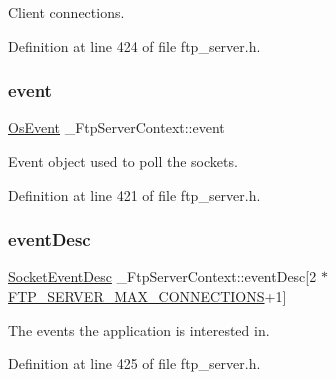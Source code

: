 Client connections. 



Definition at line 424 of file ftp\+\_\+server.\+h.

\mbox{\label{struct__FtpServerContext_a940308f73a285177761851d18321200c}} 
\subsubsection{\texorpdfstring{event}{event}}
{\footnotesize\ttfamily \hyperlink{structOsEvent}{Os\+Event} \+\_\+\+Ftp\+Server\+Context\+::event}



Event object used to poll the sockets. 



Definition at line 421 of file ftp\+\_\+server.\+h.

\mbox{\label{struct__FtpServerContext_a7cc60b8d3c7d189194126445a24a9582}} 
\subsubsection{\texorpdfstring{event\+Desc}{eventDesc}}
{\footnotesize\ttfamily \hyperlink{structSocketEventDesc}{Socket\+Event\+Desc} \+\_\+\+Ftp\+Server\+Context\+::event\+Desc\mbox{[}2 $\ast$\hyperlink{ftp__server_8h_af3d93e6b48588bd5702175cb67d65cf4}{F\+T\+P\+\_\+\+S\+E\+R\+V\+E\+R\+\_\+\+M\+A\+X\+\_\+\+C\+O\+N\+N\+E\+C\+T\+I\+O\+NS}+1\mbox{]}}



The events the application is interested in. 



Definition at line 425 of file ftp\+\_\+server.\+h.

\mbox{\label{struct__FtpServerContext_ac7a1f9ed8441187cd857c673472fa00c}} 
